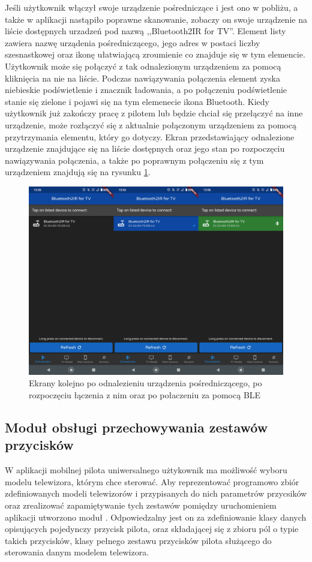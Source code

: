 \documentclass[12pt,twoside]{article}
\begin{document}
Jeśli użytkownik włączył swoje urządzenie pośredniczące i jest ono w pobliżu, a także w aplikacji nastąpiło poprawne skanowanie, zobaczy on swoje urządzenie na liście dostępnych urzadzeń pod nazwą ,,Bluetooth2IR for TV''. Element listy zawiera nazwę urządenia pośredniczącego, jego adres w postaci liczby szesnastkowej oraz ikonę ułatwiającą zroumienie co znajduje się w tym elemencie. Użytkownik może się połączyć z  tak odnalezionym urządzeniem za pomocą kliknięcia na nie na liście. Podczas nawiązywania połączenia element zyska niebieskie podświetlenie i znacznik ładowania, a po połączeniu podświetlenie stanie się zielone i pojawi się na tym elemenecie ikona Bluetooth. Kiedy użytkownik już zakończy pracę z pilotem lub będzie chciał się przełączyć na inne urządzenie, może rozłączyć się z aktualnie połączonym urządzeniem za pomocą przytrzymania elementu, który go dotyczy. Ekran przedstawiający odnalezione urządzenie znajdujące się na liście dostępnych oraz jego stan po rozpoczęciu nawiązywania połączenia, a także po poprawnym  połączeniu się z tym urządzeniem znajdują się na rysunku \ref*{Fig:connectBLE}.

\begin{figure}[ht]
   \centering
   \includegraphics[width=13cm]{images/connectBLE.png}
   \caption{Ekrany kolejno po odnalezieniu urządzenia pośredniczącego, po rozpoczęciu łączenia z nim oraz po połaczeniu za pomocą BLE}
   \label{Fig:connectBLE}
\end{figure}

\subsection{Moduł obsługi przechowywania zestawów przycisków}
W aplikacji mobilnej pilota uniwersalnego użtykownik ma możliwość wyboru modelu telewizora, którym chce sterować. Aby reprezentować programowo zbiór zdefiniowanych modeli telewizorów i przypisanych do nich parametrów przycsików  oraz zrealizować zapamiętywanie tych zestawów pomiędzy uruchomieniem aplikacji utworzono moduł . Odpowiedzalny jest on za zdefiniowanie klasy danych opisujących pojedynczy przycisk pilota, oraz składającej się z zbioru pól o typie takich przycisków, klasy pełnego zestawu przycisków pilota służącego do sterowania danym modelem telewizora. 
\end{document}
